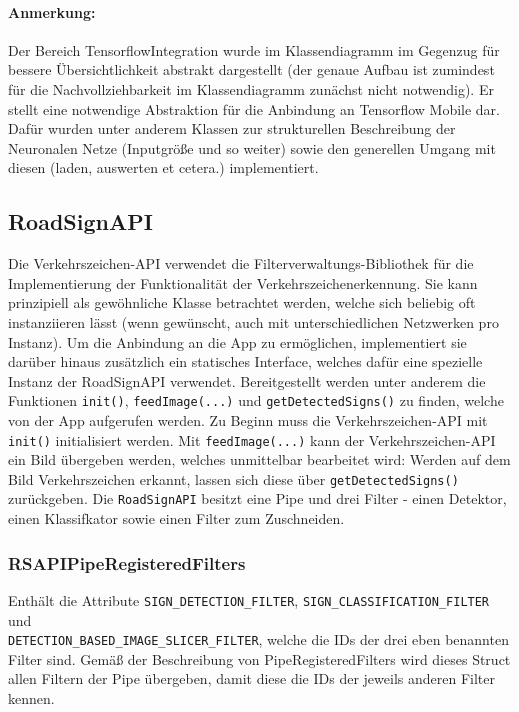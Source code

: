 \documentclass[12pt,a4paper,ngerman,enabledeprecatedfontcommands]{scrreprt}
\begin{document}
\paragraph{Anmerkung:} Der Bereich TensorflowIntegration wurde im Klassendiagramm im Gegenzug für bessere Übersichtlichkeit abstrakt dargestellt (der genaue Aufbau ist zumindest für die Nachvollziehbarkeit im Klassendiagramm zunächst nicht notwendig). Er stellt eine notwendige Abstraktion für die Anbindung an Tensorflow Mobile dar. Dafür wurden unter anderem Klassen zur strukturellen Beschreibung der Neuronalen Netze (Inputgröße und so weiter) sowie den generellen Umgang mit diesen (laden, auswerten et cetera.) implementiert.


\subsection{RoadSignAPI}
Die \gls{Verkehrszeichen-API} verwendet die Filterverwaltungs-Bibliothek für die Implementierung der Funktionalität der Verkehrszeichenerkennung. Sie kann prinzipiell als gewöhnliche Klasse betrachtet werden, welche sich beliebig oft instanziieren lässt (wenn gewünscht, auch mit unterschiedlichen Netzwerken pro Instanz).
Um die Anbindung an die \gls{App} zu ermöglichen, implementiert sie darüber hinaus zusätzlich ein statisches Interface, welches dafür eine spezielle Instanz der RoadSignAPI verwendet.
Bereitgestellt werden unter anderem die Funktionen \texttt{init()}, \texttt{feedImage(...)} und \texttt{getDetectedSigns()} zu finden, welche von der \gls{App} aufgerufen werden. Zu Beginn muss die Verkehrszeichen-API mit \texttt{init()} initialisiert werden. Mit \texttt{feedImage(...)} kann der \gls{Verkehrszeichen-API} ein Bild übergeben werden, welches unmittelbar bearbeitet wird: Werden auf dem Bild Verkehrszeichen erkannt, lassen sich diese über \texttt{getDetectedSigns()} zurückgeben.  Die \texttt{RoadSignAPI} besitzt eine Pipe und drei Filter - einen Detektor, einen Klassifkator sowie einen Filter zum Zuschneiden.\\

\subsubsection*{RSAPIPipeRegisteredFilters} Enthält die Attribute \texttt{SIGN\_DETECTION\_FILTER}, \texttt{SIGN\_CLASSIFICATION\_FILTER} und\\\texttt{DETECTION\_BASED\_IMAGE\_SLICER\_FILTER}, welche die IDs der drei eben benannten Filter sind. Gemäß der Beschreibung von PipeRegisteredFilters wird dieses Struct allen Filtern der Pipe übergeben, damit diese die IDs der jeweils anderen Filter kennen. \\
\end{document}
